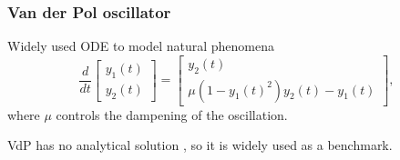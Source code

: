 \documentclass[t]{beamer}
\begin{document}
\begin{frame}
    \frametitle{Van der Pol oscillator}
    Widely used ODE to model natural phenomena \[
    \frac{d}{dt}\begin{bmatrix} y_1\left( t \right) \\ y_2\left( t \right)  \end{bmatrix} = \begin{bmatrix} 
y_2\left( t \right) \\
\mu\left( 1-y_1\left( t \right) ^2 \right) y_2\left( t \right) - y_1(t)
\end{bmatrix} 
    ,\] where $\mu$ controls the dampening of the oscillation.

    \pause
    \quad

    VdP has no analytical solution \cite{panayotounakos_lack_2003}, so it is widely used as a benchmark.
\end{frame}
\end{document}
